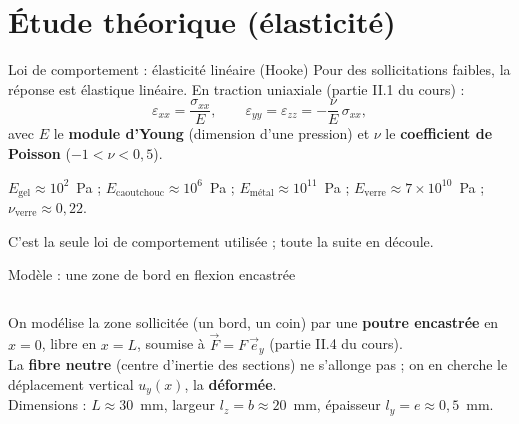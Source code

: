 \documentclass[11pt,aspectratio=169]{beamer}
\begin{document}
\section{Étude théorique (élasticité)}

\begin{frame}{Loi de comportement : élasticité linéaire (Hooke)}
  \footnotesize
  Pour des sollicitations faibles, la réponse est élastique linéaire. En traction
  uniaxiale (partie II.1 du cours) :
  \[ \varepsilon_{xx}=\frac{\sigma_{xx}}{E},\qquad
     \varepsilon_{yy}=\varepsilon_{zz}=-\frac{\nu}{E}\,\sigma_{xx}, \]
  avec $E$ le \textbf{module d'Young} (dimension d'une pression) et $\nu$ le
  \textbf{coefficient de Poisson} ($-1<\nu<0{,}5$).
  \medskip
  \begin{center}\scriptsize
  $E_{\text{gel}}\!\approx\!10^{2}$~Pa \;;\;
  $E_{\text{caoutchouc}}\!\approx\!10^{6}$~Pa \;;\;
  $E_{\text{métal}}\!\approx\!10^{11}$~Pa \;;\;
  $E_{\text{verre}}\!\approx\!7\times10^{10}$~Pa \;;\;
  $\nu_{\text{verre}}\!\approx\!0{,}22$.
  \end{center}
  \medskip
  \centering\textcolor{verre}{C'est la seule loi de comportement utilisée ;
  toute la suite en découle.}
\end{frame}

\begin{frame}{Modèle : une zone de bord en flexion encastrée}
  \begin{columns}[c]
    \centering
    \footnotesize
    On modélise la zone sollicitée (un bord, un coin) par une \textbf{poutre
    encastrée} en $x=0$, libre en $x=L$, soumise à $\vec F=F\,\vec e_y$
    (partie II.4 du cours).
    \medskip\\
    La \textbf{fibre neutre} (centre d'inertie des sections) ne s'allonge pas ; on
    en cherche le déplacement vertical $u_y(x)$, la \textbf{déformée}.
    \medskip\\
    \scriptsize Dimensions : $L\approx 30$~mm, largeur $l_z=b\approx 20$~mm,
    épaisseur $l_y=e\approx 0{,}5$~mm.
  \end{columns}
\end{frame}
\end{document}
